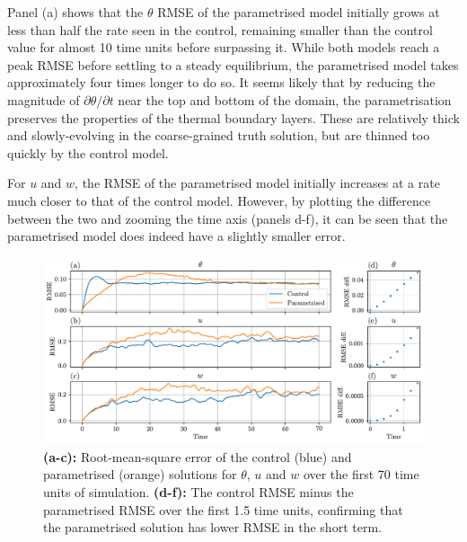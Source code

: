 \documentclass[../main.tex]{subfiles}
\begin{document}
Panel (a) shows that the $\theta$ RMSE of the parametrised model
initially grows at less than half the rate seen in the control, remaining
smaller than the control value for almost 10 time units before surpassing it.
While both models reach a peak RMSE before settling to a steady equilibrium,
the parametrised model takes approximately four times longer to do so. It seems
likely that by reducing the magnitude of $\partial\theta/\partial t$ near the
top and bottom of the domain, the parametrisation preserves the properties of
the thermal boundary layers. These are relatively thick and slowly-evolving in
the coarse-grained truth solution, but are thinned too quickly by the control
model.

For $u$ and $w$, the RMSE of the parametrised model initially increases
at a rate much closer to that of the control model. However, by plotting
the difference between the two and zooming the time axis (panels d-f),
it can be seen that the parametrised model does indeed have a slightly smaller
error.

\begin{figure}[ht]
    \centering
    \includegraphics[width=\linewidth]{figures/rmse.pdf}
    \caption{
        \textbf{(a-c):} Root-mean-square error of the control (blue) and
        parametrised (orange) solutions for $\theta$, $u$ and $w$ over
        the first 70 time units of simulation. \textbf{(d-f):} The control
        RMSE minus the parametrised RMSE over the first 1.5 time units,
        confirming that the parametrised solution has lower RMSE in the short
        term.
    }
    \label{fig:rmse}
\end{figure}
\end{document}
